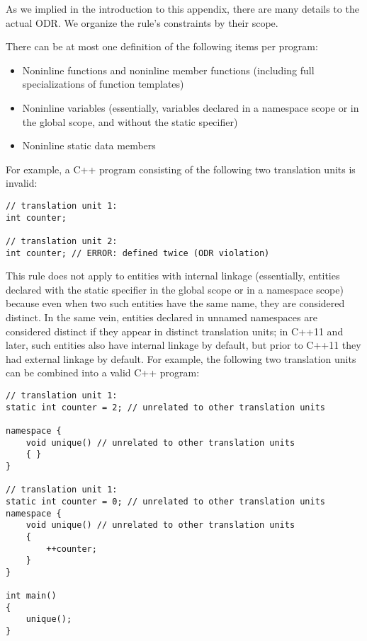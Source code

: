 
As we implied in the introduction to this appendix, there are many details to the actual ODR. We organize the rule’s constraints by their scope.


There can be at most one definition of the following items per program:

\begin{itemize}
\item 
Noninline functions and noninline member functions (including full specializations of function templates)

\item 
Noninline variables (essentially, variables declared in a namespace scope or in the global scope, and without the static specifier)

\item 
Noninline static data members
\end{itemize}

For example, a C++ program consisting of the following two translation units is invalid:

\begin{lstlisting}[style=styleCXX]
// translation unit 1:
int counter;

// translation unit 2:
int counter; // ERROR: defined twice (ODR violation)
\end{lstlisting}

This rule does not apply to entities with internal linkage (essentially, entities declared with the static specifier in the global scope or in a namespace scope) because even when two such entities have the same name, they are considered distinct. In the same vein, entities declared in unnamed namespaces are considered distinct if they appear in distinct translation units; in C++11 and later, such entities also have internal linkage by default, but prior to C++11 they had external linkage by default. For example, the following two translation units can be combined into a valid C++ program:

\begin{lstlisting}[style=styleCXX]
// translation unit 1:
static int counter = 2; // unrelated to other translation units

namespace {
	void unique() // unrelated to other translation units
	{ }
}

// translation unit 1:
static int counter = 0; // unrelated to other translation units
namespace {
	void unique() // unrelated to other translation units
	{
		++counter;
	}
}

int main()
{
	unique();
}
\end{lstlisting}

